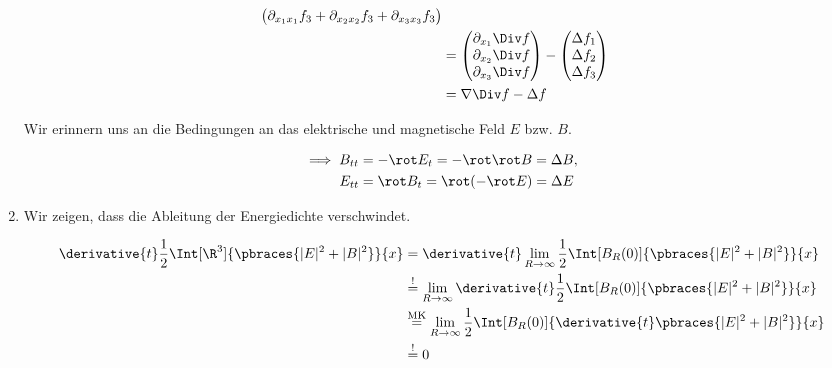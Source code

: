 \begin{solution}
\begin{enumerate}[label = (\roman*)]
\begin{align*}
\begin{pmatrix}
            \partial_{x_1 x_1} f_3 + \partial_{x_2 x_2} f_3 + \partial_{x_3 x_3} f_3 \\
        \end{pmatrix} \\
        & =
        \begin{pmatrix}
            \partial_{x_1} \Div f \\
            \partial_{x_2} \Div f \\
            \partial_{x_3} \Div f
        \end{pmatrix}
        -
        \begin{pmatrix}
            \Delta f_1 \\
            \Delta f_2 \\
            \Delta f_3
        \end{pmatrix} \\
        & =
        \nabla \Div f
        -
        \Delta f
    \end{align*}

    Wir erinnern uns an die Bedingungen an das elektrische und magnetische Feld $E$ bzw. $B$.

    \begin{align*}
        \implies
        B_{tt} & = -\rot E_t = -\rot \rot B = \Delta B, \\
        E_{tt} & = \rot B_t = \rot(-\rot E) = \Delta E
    \end{align*}

    \item Wir zeigen, dass die Ableitung der Energiedichte verschwindet.
    
    \begin{align*}
        \derivative{t}
        \frac{1}{2}
        \Int[\R^3]{\pbraces{|E|^2 + |B|^2}}{x}
        & =
        \derivative{t}
        \lim_{R \to \infty}
        \frac{1}{2}
        \Int[B_R(0)]{\pbraces{|E|^2 + |B|^2}}{x} \\
        & \stackrel{!}{=}
        \lim_{R \to \infty}
        \derivative{t}
        \frac{1}{2}
        \Int[B_R(0)]{\pbraces{|E|^2 + |B|^2}}{x} \\
        & \stackrel
        {
            \mathrm{MK}
        }{=}
        \lim_{R \to \infty}
        \frac{1}{2}
        \Int[B_R(0)]
        {
            \derivative{t}
            \pbraces{|E|^2 + |B|^2}
        }{x} \\
        & \stackrel{!}{=}
        0
    \end{align*}
    

\end{enumerate}
\end{solution}
